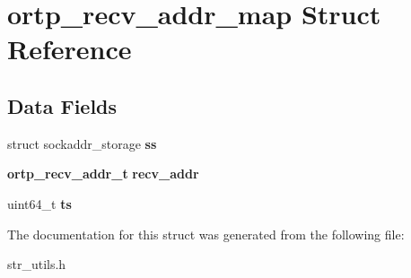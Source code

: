 \section{ortp\+\_\+recv\+\_\+addr\+\_\+map Struct Reference}
\label{structortp__recv__addr__map}
\subsection*{Data Fields}
\begin{DoxyCompactItemize}
\item 
\mbox{\label{structortp__recv__addr__map_a309332a3661511e5590b24ca98287b8b}} 
struct sockaddr\+\_\+storage {\bfseries ss}
\item 
\mbox{\label{structortp__recv__addr__map_a34ff2c30e561d96ab0f3b69637994793}} 
\textbf{ ortp\+\_\+recv\+\_\+addr\+\_\+t} {\bfseries recv\+\_\+addr}
\item 
\mbox{\label{structortp__recv__addr__map_aa84ed04265cab4bf869d0033cf63db2f}} 
uint64\+\_\+t {\bfseries ts}
\end{DoxyCompactItemize}


The documentation for this struct was generated from the following file\+:\begin{DoxyCompactItemize}
\item 
str\+\_\+utils.\+h\end{DoxyCompactItemize}
